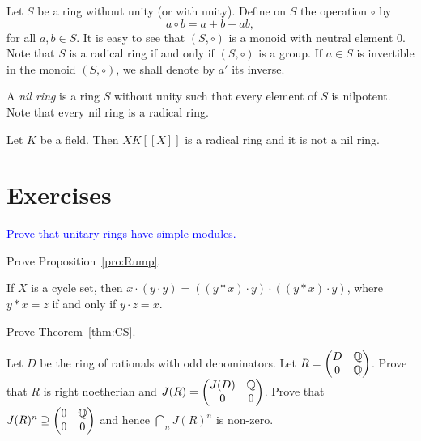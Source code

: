 Let $S$ be a ring without unity (or with unity).
Define on $S$ the operation $\circ$ by
$$a\circ b=a+b+ab,$$
for all $a,b\in S$. It is easy to see that $(S,\circ)$ is a monoid with neutral element $0$.
Note that $S$ is a radical ring if and only if $(S,\circ)$ is a group. If $a\in S$ is invertible in the monoid $(S,\circ)$, we shall denote by $a'$ its inverse.

A \emph{nil ring} is a ring $S$ without unity such that every element of $S$ is nilpotent. Note that every nil ring is a radical ring.

\begin{example} 
Let $K$ be a field. Then $XK[\![X]\!]$ is a radical ring 
and it is not a nil ring.
\end{example}


\section{Exercises}

\begin{prob}
    \label{prob:Zorn_simple}
    \textcolor{blue}{Prove that unitary rings have simple modules.} 
\end{prob}

\begin{prob}
	\label{prob:Rump}
	Prove Proposition~\ref{pro:Rump}. 
\end{prob}

\begin{prob}
	If $X$ is a cycle set, then $x\cdot (y\cdot y)=((y*x)\cdot y)\cdot ((y*x)\cdot y)$, where
	$y*x=z$ if and only if $y\cdot z=x$. 
\end{prob}

\begin{prob}
	\label{prob:CS}
	Prove Theorem~\ref{thm:CS}. 
\end{prob}

\begin{prob}
\label{prob:Herstein}
Let $D$ be the ring of rationals with odd denominators. Let
$R=\begin{pmatrix}
    D & \mathbb{Q}\\
    0 & \mathbb{Q}
\end{pmatrix}$. Prove that $R$ is right noetherian and 
$J(R)=\begin{pmatrix}
J(D) & \mathbb{Q}\\
0 & 0
\end{pmatrix}$. Prove that 
$J(R)^n\supseteq\begin{pmatrix}0&\mathbb{Q}\\0&0\end{pmatrix}$ and hence $\bigcap_nJ(R)^n$ is non-zero. 
\end{prob}

